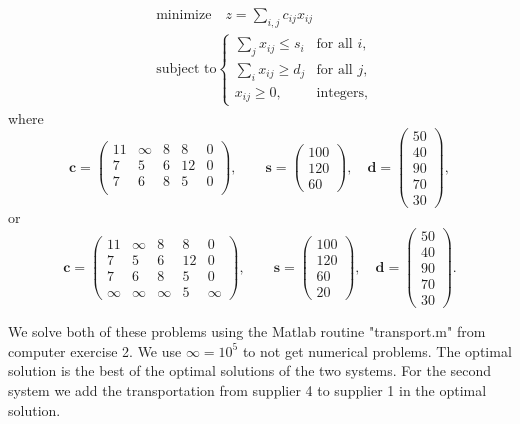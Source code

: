 \documentclass[a4paper]{article}
\begin{document}
\begin{align}
&\text{minimize}\quad z = \sum_{i,j} c_{ij} x_{ij}\\
&\text{subject to} 
\begin{cases}
\sum_j x_{ij} \leq s_i  &\text{for all } i,\\
\sum_i x_{ij} \geq d_j &\text{for all } j,\\
x_{ij} \geq 0, &\text{integers},
\end{cases}
\end{align}
where
$$\mathbf{c} = 
\left(
\begin{array}{ccccc}
11 & \infty & 8 & 8 & 0\\
7 & 5 & 6 & 12 & 0\\
7 & 6 & 8 & 5 & 0\\
\end{array}
\right), \quad
\quad \mathbf{s} = 
\left(
\begin{array}{c}
100\\120\\60
\end{array}
\right),\quad \mathbf{d} = 
\left( 
\begin{array}{c}
50\\40\\90\\70\\30
\end{array}
\right),
$$
or
$$\mathbf{c} = 
\left(
\begin{array}{ccccc}
11 & \infty & 8 & 8 & 0\\
7 & 5 & 6 & 12 & 0\\
7 & 6 & 8 & 5 & 0\\
\infty & \infty & \infty & 5 & \infty
\end{array}
\right), \quad
\quad \mathbf{s} = 
\left(
\begin{array}{c}
100\\120\\60\\20
\end{array}
\right),\quad \mathbf{d} = 
\left( 
\begin{array}{c}
50\\40\\90\\70\\30
\end{array}
\right).
$$

We solve both of these problems using the Matlab routine "transport.m" from computer exercise 2. We use $\infty=10^5$ to not get numerical problems. The optimal solution is the best of the optimal solutions of the two systems. For the second system we add the transportation from supplier 4 to supplier 1 in the optimal solution.\\ 
\end{document}
